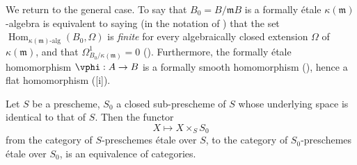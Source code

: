 \begin{env}[18.1.4]
\label{IV.18.1.4}
We return to the general case.
To say that $B_0=B/\mathfrak{m}B$ is a formally \'etale $\kappa(\mathfrak{m})$-algebra is equivalent to saying (in the notation of ) that the set $\operatorname{Hom}_{\kappa(\mathfrak{m})\text{-}\mathrm{alg}}(B_0,\Omega)$ is \emph{finite} for every algebraically closed extension $\Omega$ of $\kappa(\mathfrak{m})$, and that $\Omega^1_{B_0/\kappa(\mathfrak{m})}=0$ ().
Furthermore, the formally \'etale homomorphism $\vphi:A\to B$ is a formally smooth homomorphism (), hence a flat homomorphism ([i]).
\end{env}

\begin{theorem}[18.1.2]
\label{IV.18.1.2.thm}
Let $S$ be a prescheme, $S_0$ a closed sub-prescheme of $S$ whose underlying space is identical to that of $S$.
Then the functor
\[
X\mapsto X\times_S S_0
\]
from the category of $S$-preschemes \'etale over $S$, to the category of $S_0$-preschemes \'etale over $S_0$, is an equivalence of categories.
\end{theorem}

